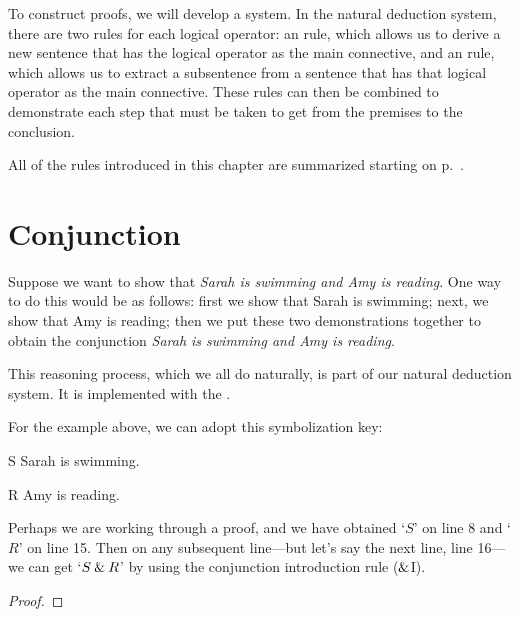 To construct proofs, we will develop a  system. In the natural deduction system, there are two rules for each logical operator: an  rule, which allows us to derive a new sentence that has the logical operator as the main connective, and an  rule, which allows us to extract a subsentence from a sentence that has that logical operator as the main connective. These rules can then be combined to demonstrate each step that must be taken to get from the premises to the conclusion.

All of the rules introduced in this chapter are summarized starting on p.~\pageref{ProofRules}.


\section{Conjunction}\label{s:conj-rule}

Suppose we want to show that \textit{Sarah is swimming and Amy is reading}. One way to do this would be as follows: first we show that Sarah is swimming; next, we show that Amy is reading; then we put these two demonstrations together to obtain the conjunction \textit{Sarah is swimming and Amy is reading}.

This reasoning process, which we all do naturally, is part of our natural deduction system. It is implemented with the . 


For the example above, we can adopt this symbolization key:
	\begin{ekey}
		\item[S] Sarah is swimming.
		\item[R] Amy is reading.
	\end{ekey}
Perhaps we are working through a proof, and we have obtained `$S$' on line 8 and `$R$' on line 15. Then on any subsequent line---but let's say the next line, line 16---we can get `$S \mathbin{\&} R$' by using the conjunction introduction rule ($\mathbin{\&}$I).
\begin{proof}
	 \by{\ldots}{}
	 \by{\ldots}{}
	 
\end{proof}

